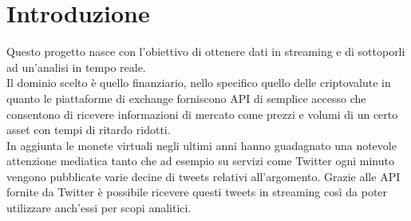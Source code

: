 \section{Introduzione}

Questo progetto nasce con l'obiettivo di ottenere dati in streaming e di sottoporli ad un'analisi
in tempo reale.\\
Il dominio scelto è quello finanziario, nello specifico quello delle criptovalute in quanto le piattaforme di exchange forniscono API di semplice accesso che consentono di ricevere informazioni di mercato come prezzi e volumi di un certo asset con tempi di ritardo ridotti.\\
In aggiunta le monete virtuali negli ultimi anni hanno guadagnato una notevole attenzione mediatica tanto che ad esempio su servizi come Twitter ogni minuto vengono pubblicate varie decine di tweets relativi all'argomento. Grazie alle API fornite da Twitter è possibile ricevere questi tweets in streaming così da poter utilizzare anch'essi per scopi analitici.